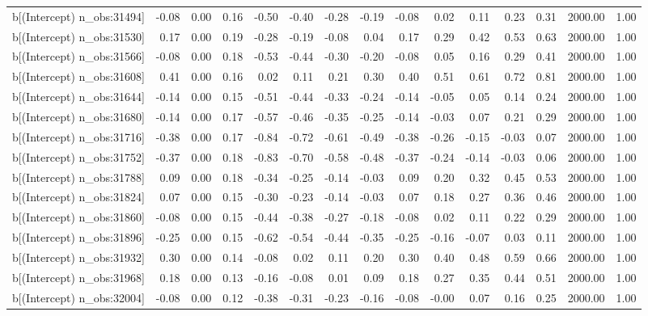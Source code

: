 \begin{table}[ht]
\begin{tabular}{rrrrrrrrrrrrrrr}
  b[(Intercept) n\_obs:31494] & -0.08 & 0.00 & 0.16 & -0.50 & -0.40 & -0.28 & -0.19 & -0.08 & 0.02 & 0.11 & 0.23 & 0.31 & 2000.00 & 1.00 \\ 
  b[(Intercept) n\_obs:31530] & 0.17 & 0.00 & 0.19 & -0.28 & -0.19 & -0.08 & 0.04 & 0.17 & 0.29 & 0.42 & 0.53 & 0.63 & 2000.00 & 1.00 \\ 
  b[(Intercept) n\_obs:31566] & -0.08 & 0.00 & 0.18 & -0.53 & -0.44 & -0.30 & -0.20 & -0.08 & 0.05 & 0.16 & 0.29 & 0.41 & 2000.00 & 1.00 \\ 
  b[(Intercept) n\_obs:31608] & 0.41 & 0.00 & 0.16 & 0.02 & 0.11 & 0.21 & 0.30 & 0.40 & 0.51 & 0.61 & 0.72 & 0.81 & 2000.00 & 1.00 \\ 
  b[(Intercept) n\_obs:31644] & -0.14 & 0.00 & 0.15 & -0.51 & -0.44 & -0.33 & -0.24 & -0.14 & -0.05 & 0.05 & 0.14 & 0.24 & 2000.00 & 1.00 \\ 
  b[(Intercept) n\_obs:31680] & -0.14 & 0.00 & 0.17 & -0.57 & -0.46 & -0.35 & -0.25 & -0.14 & -0.03 & 0.07 & 0.21 & 0.29 & 2000.00 & 1.00 \\ 
  b[(Intercept) n\_obs:31716] & -0.38 & 0.00 & 0.17 & -0.84 & -0.72 & -0.61 & -0.49 & -0.38 & -0.26 & -0.15 & -0.03 & 0.07 & 2000.00 & 1.00 \\ 
  b[(Intercept) n\_obs:31752] & -0.37 & 0.00 & 0.18 & -0.83 & -0.70 & -0.58 & -0.48 & -0.37 & -0.24 & -0.14 & -0.03 & 0.06 & 2000.00 & 1.00 \\ 
  b[(Intercept) n\_obs:31788] & 0.09 & 0.00 & 0.18 & -0.34 & -0.25 & -0.14 & -0.03 & 0.09 & 0.20 & 0.32 & 0.45 & 0.53 & 2000.00 & 1.00 \\ 
  b[(Intercept) n\_obs:31824] & 0.07 & 0.00 & 0.15 & -0.30 & -0.23 & -0.14 & -0.03 & 0.07 & 0.18 & 0.27 & 0.36 & 0.46 & 2000.00 & 1.00 \\ 
  b[(Intercept) n\_obs:31860] & -0.08 & 0.00 & 0.15 & -0.44 & -0.38 & -0.27 & -0.18 & -0.08 & 0.02 & 0.11 & 0.22 & 0.29 & 2000.00 & 1.00 \\ 
  b[(Intercept) n\_obs:31896] & -0.25 & 0.00 & 0.15 & -0.62 & -0.54 & -0.44 & -0.35 & -0.25 & -0.16 & -0.07 & 0.03 & 0.11 & 2000.00 & 1.00 \\ 
  b[(Intercept) n\_obs:31932] & 0.30 & 0.00 & 0.14 & -0.08 & 0.02 & 0.11 & 0.20 & 0.30 & 0.40 & 0.48 & 0.59 & 0.66 & 2000.00 & 1.00 \\ 
  b[(Intercept) n\_obs:31968] & 0.18 & 0.00 & 0.13 & -0.16 & -0.08 & 0.01 & 0.09 & 0.18 & 0.27 & 0.35 & 0.44 & 0.51 & 2000.00 & 1.00 \\ 
  b[(Intercept) n\_obs:32004] & -0.08 & 0.00 & 0.12 & -0.38 & -0.31 & -0.23 & -0.16 & -0.08 & -0.00 & 0.07 & 0.16 & 0.25 & 2000.00 & 1.00 \\ 

\end{tabular}
\end{table}
